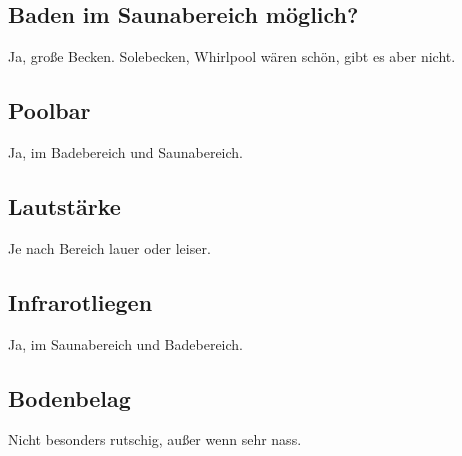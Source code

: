 \documentclass{article}
\begin{document}
\subsection*{Baden im Saunabereich möglich?} Ja, große Becken. Solebecken, Whirlpool wären schön, gibt es aber nicht.
\subsection*{Poolbar} Ja, im Badebereich und Saunabereich.
\subsection*{Lautstärke} Je nach Bereich lauer oder leiser.
\subsection*{Infrarotliegen} Ja, im Saunabereich und Badebereich.
\subsection*{Bodenbelag} Nicht besonders rutschig, außer wenn sehr nass.
\pagebreak
\end{document}
